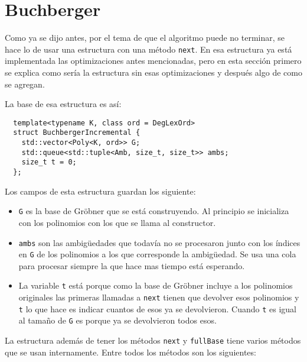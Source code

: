 \documentclass{report}
\theoremstyle{customstyle}
\theoremstyle{factstyle}
\begin{document}
\section{Buchberger}

Como ya se dijo antes, por el tema de que el algoritmo puede no terminar, se hace lo de usar una estructura con una método \texttt{next}. En esa estructura ya está implementada las optimizaciones antes mencionadas, pero en esta sección primero se explica como sería la estructura sin esas optimizaciones y después algo de como se agregan.

La base de esa estructura es así:

\begin{verbatim}
  template<typename K, class ord = DegLexOrd>
  struct BuchbergerIncremental {
    std::vector<Poly<K, ord>> G;
    std::queue<std::tuple<Amb, size_t, size_t>> ambs;
    size_t t = 0;
  };
\end{verbatim}

Los campos de esta estructura guardan los siguiente:

\begin{itemize}
  \item \texttt{G} es la base de Gröbner que se está construyendo. Al principio se inicializa con los polinomios con los que se llama al constructor.
  \item \texttt{ambs} son las ambigüedades que todavía no se procesaron junto con los índices en \texttt{G} de los polinomios a los que corresponde la ambigüedad. Se usa una cola para procesar siempre la que hace mas tiempo está esperando.
  \item La variable \texttt{t} está porque como la base de Gröbner incluye a los polinomios originales las primeras llamadas a \texttt{next} tienen que devolver esos polinomios y \texttt{t} lo que hace es indicar cuantos de esos ya se devolvieron. Cuando \texttt{t} es igual al tamaño de \texttt{G} es porque ya se devolvieron todos esos.
\end{itemize}

La estructura además de tener los métodos \texttt{next} y \texttt{fullBase} tiene varios métodos que se usan internamente. Entre todos los métodos son los siguientes:
\end{document}

